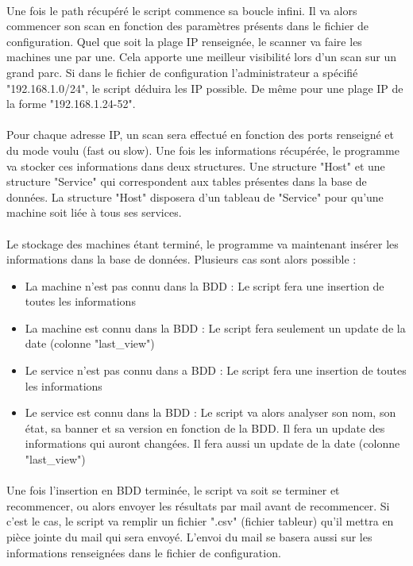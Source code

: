 \documentclass[12pt]{report}
\begin{document}
		\paragraph{}
			Une fois le path récupéré le script commence sa boucle infini. Il va alors commencer son scan en fonction des paramètres présents dans le fichier de configuration. Quel que soit la plage IP renseignée, le scanner va faire les machines une par une. Cela apporte une meilleur visibilité lors d'un scan sur un grand parc. Si dans le fichier de configuration l'administrateur a spécifié "192.168.1.0/24", le script déduira les IP possible. De même pour une plage IP de la forme "192.168.1.24-52".
		\paragraph{}
			Pour chaque adresse IP, un scan sera effectué en fonction des ports renseigné et du mode voulu (fast ou slow). Une fois les informations récupérée, le programme va stocker ces informations dans deux structures. Une structure "Host" et une structure "Service" qui correspondent aux tables présentes dans la base de données. La structure "Host" disposera d'un tableau de "Service" pour qu'une machine soit liée à tous ses services.
		\paragraph{}
			Le stockage des machines étant terminé, le programme va maintenant insérer les informations dans la base de données. Plusieurs cas sont alors possible :
			\begin{itemize}
				\item La machine n'est pas connu dans la BDD : Le script fera une insertion de toutes les informations
				\item La machine est connu dans la BDD : Le script fera seulement un update de la date (colonne "last\_view")
				\item Le service n'est pas connu dans a BDD : Le script fera une insertion de toutes les informations
				\item Le service est connu dans la BDD : Le script va alors analyser son nom, son état, sa banner et sa version en fonction de la BDD. Il fera un update des informations qui auront changées. Il fera aussi un update de la date (colonne "last\_view")
			\end{itemize}
		\paragraph{}
			Une fois l'insertion en BDD terminée, le script va soit se terminer et recommencer, ou alors envoyer les résultats par mail avant de recommencer. Si c'est le cas, le script va remplir un fichier ".csv" (fichier tableur) qu'il mettra en pièce jointe du mail qui sera envoyé. L'envoi du mail se basera aussi sur les informations renseignées dans le fichier de configuration.
\end{document}
